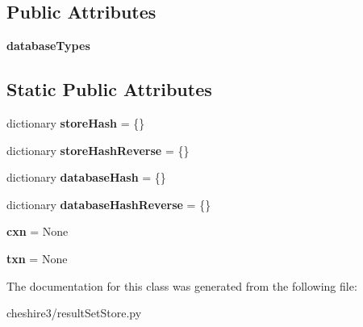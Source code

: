 \subsection*{Public Attributes}
\begin{DoxyCompactItemize}
\item 
\hypertarget{classcheshire3_1_1result_set_store_1_1_bdb_result_set_store_a8ae3ecceed9edc915c332a9a079724c7}{{\bfseries database\-Types}}\label{classcheshire3_1_1result_set_store_1_1_bdb_result_set_store_a8ae3ecceed9edc915c332a9a079724c7}

\end{DoxyCompactItemize}
\subsection*{Static Public Attributes}
\begin{DoxyCompactItemize}
\item 
\hypertarget{classcheshire3_1_1result_set_store_1_1_bdb_result_set_store_abb2d438c25f0e8c3d7deb9aa9a6676ff}{dictionary {\bfseries store\-Hash} = \{\}}\label{classcheshire3_1_1result_set_store_1_1_bdb_result_set_store_abb2d438c25f0e8c3d7deb9aa9a6676ff}

\item 
\hypertarget{classcheshire3_1_1result_set_store_1_1_bdb_result_set_store_a73b30745be26a99bf296c3199cfafca8}{dictionary {\bfseries store\-Hash\-Reverse} = \{\}}\label{classcheshire3_1_1result_set_store_1_1_bdb_result_set_store_a73b30745be26a99bf296c3199cfafca8}

\item 
\hypertarget{classcheshire3_1_1result_set_store_1_1_bdb_result_set_store_a0a697466a19b7f90a5a3e25e2cc8a57e}{dictionary {\bfseries database\-Hash} = \{\}}\label{classcheshire3_1_1result_set_store_1_1_bdb_result_set_store_a0a697466a19b7f90a5a3e25e2cc8a57e}

\item 
\hypertarget{classcheshire3_1_1result_set_store_1_1_bdb_result_set_store_aea617b88cab33e9e59b74fc83214de85}{dictionary {\bfseries database\-Hash\-Reverse} = \{\}}\label{classcheshire3_1_1result_set_store_1_1_bdb_result_set_store_aea617b88cab33e9e59b74fc83214de85}

\item 
\hypertarget{classcheshire3_1_1result_set_store_1_1_bdb_result_set_store_a7d75f395bec21caf86abecf46fdc4de7}{{\bfseries cxn} = None}\label{classcheshire3_1_1result_set_store_1_1_bdb_result_set_store_a7d75f395bec21caf86abecf46fdc4de7}

\item 
\hypertarget{classcheshire3_1_1result_set_store_1_1_bdb_result_set_store_a0ba4ec99b56eb7346fbbc2a7dbf6afa4}{{\bfseries txn} = None}\label{classcheshire3_1_1result_set_store_1_1_bdb_result_set_store_a0ba4ec99b56eb7346fbbc2a7dbf6afa4}

\end{DoxyCompactItemize}


The documentation for this class was generated from the following file\-:\begin{DoxyCompactItemize}
\item 
cheshire3/result\-Set\-Store.\-py\end{DoxyCompactItemize}
